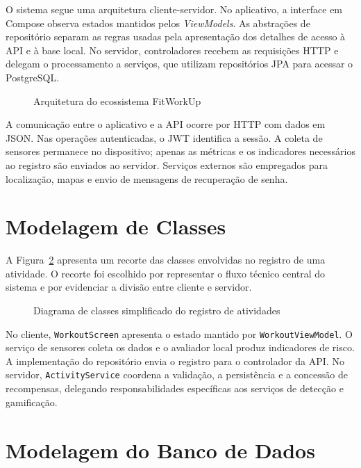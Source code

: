 O sistema segue uma arquitetura cliente-servidor. No aplicativo, a interface em Compose observa estados mantidos pelos \textit{ViewModels}. As abstrações de repositório separam as regras usadas pela apresentação dos detalhes de acesso à API e à base local. No servidor, controladores recebem as requisições HTTP e delegam o processamento a serviços, que utilizam repositórios JPA para acessar o PostgreSQL.

\begin{figure}[H]
    \centering
    \resizebox{\textwidth}{!}{}
    \caption{Arquitetura do ecossistema FitWorkUp}
    \label{fig:arquitetura_fitworkup}
\end{figure}

A comunicação entre o aplicativo e a API ocorre por HTTP com dados em JSON. Nas operações autenticadas, o JWT identifica a sessão. A coleta de sensores permanece no dispositivo; apenas as métricas e os indicadores necessários ao registro são enviados ao servidor. Serviços externos são empregados para localização, mapas e envio de mensagens de recuperação de senha.

\section{Modelagem de Classes}
\label{sec:fitworkup_classes}

A Figura~\ref{fig:classes_fitworkup} apresenta um recorte das classes envolvidas no registro de uma atividade. O recorte foi escolhido por representar o fluxo técnico central do sistema e por evidenciar a divisão entre cliente e servidor.

\begin{figure}[H]
    \centering
    \resizebox{\textwidth}{!}{}
    \caption{Diagrama de classes simplificado do registro de atividades}
    \label{fig:classes_fitworkup}
\end{figure}

No cliente, \texttt{WorkoutScreen} apresenta o estado mantido por \texttt{WorkoutViewModel}. O serviço de sensores coleta os dados e o avaliador local produz indicadores de risco. A implementação do repositório envia o registro para o controlador da API. No servidor, \texttt{ActivityService} coordena a validação, a persistência e a concessão de recompensas, delegando responsabilidades específicas aos serviços de detecção e gamificação.

\section{Modelagem do Banco de Dados}
\label{sec:fitworkup_banco}

